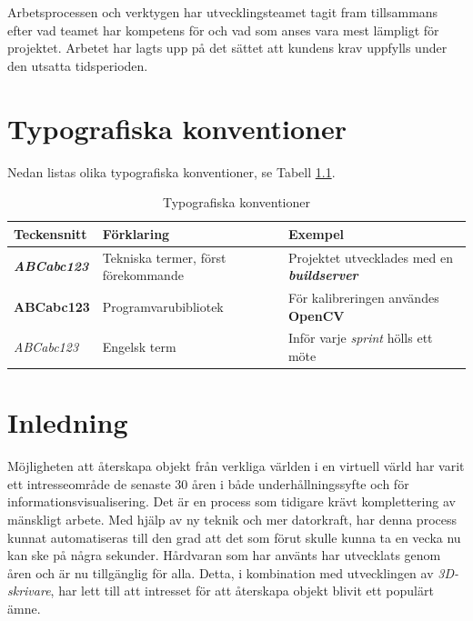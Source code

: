 \documentclass[a4paper,12pt,oneside,final]{extbook}
\begin{document}
Arbetsprocessen och verktygen har utvecklingsteamet tagit fram tillsammans efter vad teamet har kompetens för och vad som anses vara mest lämpligt för projektet. Arbetet har lagts upp på det sättet att kundens krav uppfylls under den utsatta tidsperioden.

\tableofcontents

\cleardoublepage
{}
\listoffigures

\cleardoublepage
{}
\listoftables

\chapter{Typografiska konventioner}
Nedan listas olika typografiska konventioner, se Tabell \ref{tbl:typokonv}.
\begin{table}[h]
\centering
\caption{Typografiska konventioner}
\label{tbl:typokonv}
\begin{tabular}{| l | l | l |}
\hline
Teckensnitt & Förklaring & Exempel \\ \hline
\textbf{\emph{ABCabc123}} & Tekniska termer, först förekommande  & Projektet utvecklades med en \textbf{\emph{buildserver}}\\
\textbf{ABCabc123} & Programvarubibliotek & För kalibreringen användes \textbf{OpenCV}\\
\emph{ABCabc123} & Engelsk term & Inför varje \emph{sprint} hölls ett möte \\
\hline
\end{tabular}
\end{table}

\mainmatter

\chapter{Inledning}
\label{ch:inledning}
Möjligheten att återskapa objekt från verkliga världen i en virtuell värld har varit ett intresseområde de senaste 30 åren i både underhållningssyfte och för informationsvisualisering\cite{craigroberts}. Det är en process som tidigare krävt komplettering av mänskligt arbete. Med hjälp av ny teknik och mer datorkraft, har denna process kunnat automatiseras till den grad att det som förut skulle kunna ta en vecka nu kan ske på några sekunder. Hårdvaran som har använts har utvecklats genom åren och är nu tillgänglig för alla. Detta, i kombination med utvecklingen av \emph{3D-skrivare}, har lett till att intresset för att återskapa objekt blivit ett populärt ämne.
\end{document}
